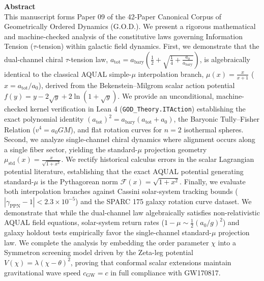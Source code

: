 \documentclass[11pt,a4paper]{article}
\theoremstyle{definition}
\begin{document}
\begin{mdframed}[style=codex]
{\color{gold}\bfseries Abstract}\\[0.2cm]
{\small
This manuscript forms Paper 09 of the 42-Paper Canonical Corpus of Geometrically Ordered Dynamics (G.O.D.). We present a rigorous mathematical and machine-checked analysis of the constitutive laws governing Information Tension ($\tau$-tension) within galactic field dynamics. First, we demonstrate that the dual-channel chiral $\tau$-tension law, $a_{\text{tot}} = a_{\text{bary}}\left(\frac{1}{2} + \sqrt{\frac{1}{4} + \frac{a_0}{a_{\text{bary}}}}\right)$, is algebraically identical to the classical AQUAL simple-$\mu$ interpolation branch, $\mu(x) = \frac{x}{x+1}$ ($x = a_{\text{tot}}/a_0$), derived from the Bekenstein--Milgrom scalar action potential $f(y) = y - 2\sqrt{y} + 2\ln(1+\sqrt{y})$. We provide an unconditional, machine-checked kernel verification in Lean 4 (\texttt{GOD\_Theory.ITAction}) establishing the exact polynomial identity $(a_{\text{tot}})^2 = a_{\text{bary}}(a_{\text{tot}} + a_0)$, the Baryonic Tully--Fisher Relation ($v^4 = a_0 G M$), and flat rotation curves for $n=2$ isothermal spheres. Second, we analyze single-channel chiral dynamics where alignment occurs along a single fiber sector, yielding the standard-$\mu$ projection geometry $\mu_{\text{std}}(x) = \frac{x}{\sqrt{1+x^2}}$. We rectify historical calculus errors in the scalar Lagrangian potential literature, establishing that the exact AQUAL potential generating standard-$\mu$ is the Pythagorean norm $\mathcal{F}(x) = \sqrt{1+x^2}$. Finally, we evaluate both interpolation branches against Cassini solar-system tracking bounds ($|\gamma_{\text{PPN}}-1| < 2.3 \times 10^{-5}$) and the SPARC 175 galaxy rotation curve dataset. We demonstrate that while the dual-channel law algebraically satisfies non-relativistic AQUAL field equations, solar-system return rates ($1-\mu \sim \frac{1}{2}(a_0/g)^2$) and galaxy holdout tests empirically favor the single-channel standard-$\mu$ projection law. We complete the analysis by embedding the order parameter $\chi$ into a Symmetron screening model driven by the Zeta-leg potential $V(\chi) = \lambda(\chi - \theta)^2$, proving that conformal scalar extensions maintain gravitational wave speed $c_{\text{GW}} = c$ in full compliance with GW170817.
}
\end{mdframed}

\vspace{0.4cm}

\tableofcontents
\newpage
\end{document}
